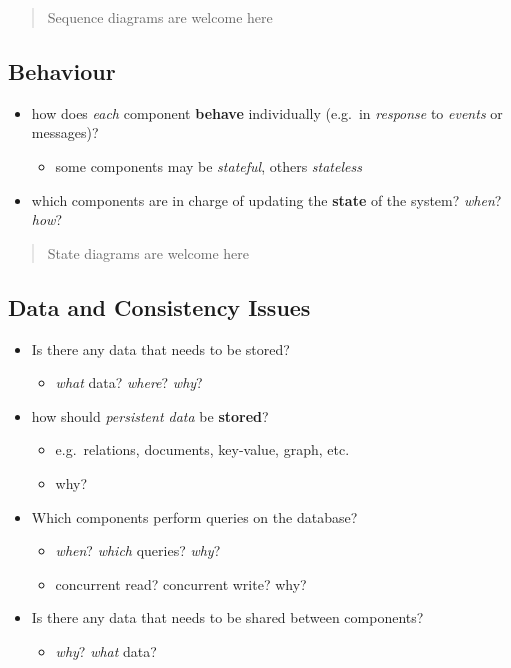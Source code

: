 \documentclass{scrartcl}
\begin{document}
\begin{quote}
Sequence diagrams are welcome here
\end{quote}

\subsection{Behaviour}\label{behaviour}

\begin{itemize}
  \item how does \emph{each} component \textbf{behave} individually (e.g.~in \emph{response} to \emph{events} or messages)?
  \begin{itemize}
    \item some components may be \emph{stateful}, others \emph{stateless}
  \end{itemize}

  \item which components are in charge of updating the \textbf{state} of the system? \emph{when}? \emph{how}?
\end{itemize}

\begin{quote}
State diagrams are welcome here
\end{quote}

\subsection{Data and Consistency Issues}\label{data-and-consistency-issues}

\begin{itemize}
  \item Is there any data that needs to be stored?
  \begin{itemize}
    \item \emph{what} data? \emph{where}? \emph{why}?
  \end{itemize}
  
  \item how should \emph{persistent data} be \textbf{stored}?
  \begin{itemize}
    \item e.g.~relations, documents, key-value, graph, etc.
    \item why?
  \end{itemize}
  
  \item Which components perform queries on the database?
  \begin{itemize}
    \item \emph{when}? \emph{which} queries? \emph{why}?
    \item concurrent read? concurrent write? why?
  \end{itemize}
  
  \item Is there any data that needs to be shared between components?
  \begin{itemize}
    \item \emph{why}? \emph{what} data?
  \end{itemize}
\end{itemize}
\end{document}
